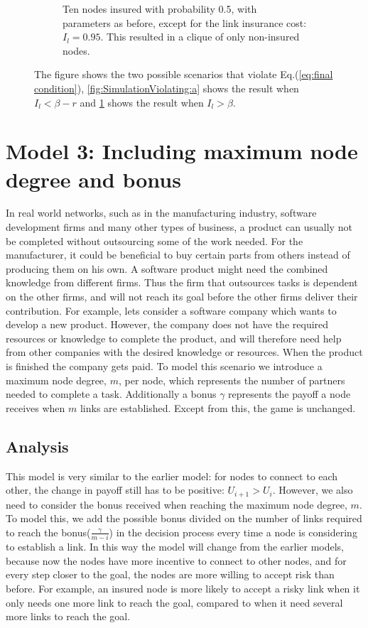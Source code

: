 \begin{figure}[h]
\begin{subfigure}{0.9\textwidth}
\caption{\label{fig:SimulationViolating:b} Ten nodes insured with probability 0.5, with parameters as before, except for the link insurance cost: $I_{l}=0.95$. This resulted in a clique of only non-insured nodes. }
\end{subfigure}
\caption{\label{fig:SimulationViolating} The figure shows the two possible scenarios that violate Eq.(\ref{eq:final condition}), \ref{fig:SimulationViolating:a} shows the result when $I_{l}<\beta-r$ and \ref{fig:SimulationViolating:b} shows the result when $I_{l}>\beta$.}
\end{figure}




\section{Model 3: Including maximum node degree and bonus}
In real world networks, such as in the manufacturing industry, software development firms and many other types of business, a product can usually not be completed without outsourcing some of the work needed. For the manufacturer, it could be beneficial to buy certain parts from others instead of producing them on his own. A software product might need the combined knowledge from different firms. Thus the firm that outsources tasks is dependent on the other firms, and will not reach its goal before the other firms deliver their contribution. 
For example, lets consider a software company which wants to develop a new product. However, the company does not have the required resources or knowledge to complete the product, and will therefore need help from other companies with the desired knowledge or resources. When the product is finished the company gets paid.
To model this scenario we introduce a maximum node degree, $m$, per node, which represents the number of partners needed to complete a task. Additionally a bonus $\gamma$ represents the payoff a node receives when $m$ links are established. Except from this, the game is unchanged.
\subsection{Analysis}
This model is very similar to the earlier model: for nodes to connect to each other, the change in payoff still has to be positive: $U_{i+1} > U_{i}$. However, we also need to consider the bonus received when reaching the maximum node degree, $m$. 
To model this, we add the possible bonus divided on the number of links required to reach the bonus($\frac{\gamma}{m-i}$) in the decision process every time a node is considering to establish a link. 
In this way the model will change from the earlier models, because now the nodes have more incentive to connect to other nodes, and for every step closer to the goal, the nodes are more willing to accept risk than before. For example, an insured node is more likely to accept a risky link when it only needs one more link to reach the goal, compared to when it need several more links to reach the goal.

